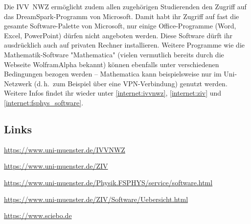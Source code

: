 \begin{multicols}{2}
Die IVV~NWZ ermöglicht zudem allen zugehörigen Studierenden den Zugriff auf das DreamSpark-Programm von Microsoft. Damit habt ihr Zugriff auf fast die gesamte Software-Palette von Microsoft, nur einige Office-Programme (Word, Excel, PowerPoint) dürfen nicht angeboten werden. Diese Software dürft ihr ausdrücklich auch auf privaten Rechner installieren. Weitere Programme wie die Mathematik-Software "Mathematica" (vielen vermutlich bereits durch die Webseite WolframAlpha bekannt) können ebenfalls unter verschiedenen Bedingungen bezogen werden -- Mathematica kann beispielsweise nur im Uni-Netzwerk (d.\,h.\ zum Beispiel über eine VPN-Verbindung) genutzt werden. Weitere Infos findet ihr wieder unter \cref{internet:ivvnwz}, \cref{internet:ziv} und \cref{internet:fsphys_software}.

\subsection*{Links}
\begin{flushleft}
\begin{fibelurl}
\url{https://www.uni-muenster.de/IVVNWZ}
\label{internet:ivvnwz}
\end{fibelurl}
\begin{fibelurl}
\url{https://www.uni-muenster.de/ZIV}
\label{internet:ziv}
\end{fibelurl}
\begin{fibelurl}
\url{https://www.uni-muenster.de/Physik.FSPHYS/service/software.html}
\label{internet:fsphys_software}
\end{fibelurl}
\begin{fibelurl}
\url{https://www.uni-muenster.de/ZIV/Software/Uebersicht.html}
\label{internet:ziv_software}
\end{fibelurl}
\begin{fibelurl}
	\url{https://www.sciebo.de}
	\label{internet:sciebo}
\end{fibelurl}
\end{flushleft}

\end{multicols}

